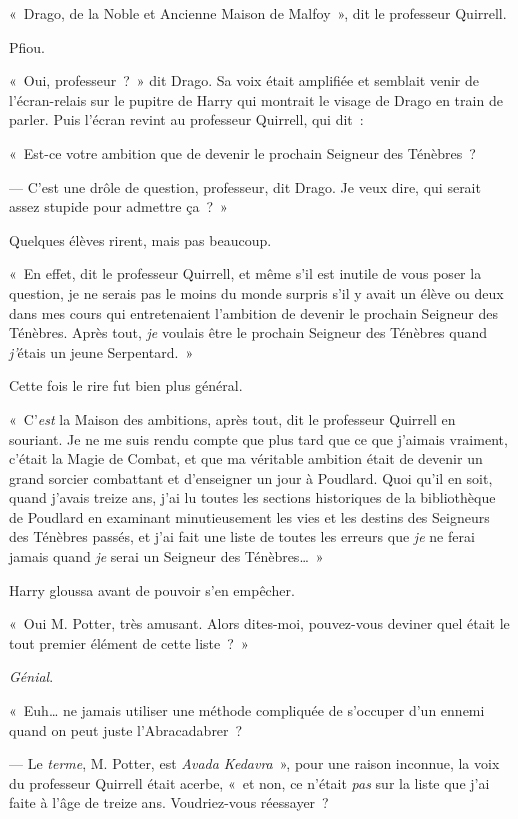 «~Drago, de la Noble et Ancienne Maison de Malfoy~», dit le professeur Quirrell.

Pfiou.

«~Oui, professeur~?~»
dit Drago.
Sa voix était amplifiée et semblait venir de l'écran-relais sur le pupitre de Harry qui montrait le visage de Drago en train de parler.
Puis l'écran revint au professeur Quirrell, qui dit~:

«~Est-ce votre ambition que de devenir le prochain Seigneur des Ténèbres~?

--- C'est une drôle de question, professeur, dit Drago.
Je veux dire, qui serait assez stupide pour admettre ça~?~»

Quelques élèves rirent, mais pas beaucoup.

«~En effet, dit le professeur Quirrell, et même s'il est inutile de vous poser la question, je ne serais pas le moins du monde surpris s'il y avait un élève ou deux dans mes cours qui entretenaient l'ambition de devenir le prochain Seigneur des Ténèbres.
Après tout, \emph{je} voulais être le prochain Seigneur des Ténèbres quand \emph{j'}étais un jeune Serpentard.~»

Cette fois le rire fut bien plus général.

«~C'\emph{est} la Maison des ambitions, après tout, dit le professeur Quirrell en souriant.
Je ne me suis rendu compte que plus tard que ce que j'aimais vraiment, c'était la Magie de Combat, et que ma véritable ambition était de devenir un grand sorcier combattant et d'enseigner un jour à Poudlard.
Quoi qu'il en soit, quand j'avais treize ans, j'ai lu toutes les sections historiques de la bibliothèque de Poudlard en examinant minutieusement les vies et les destins des Seigneurs des Ténèbres passés, et j'ai fait une liste de toutes les erreurs que \emph{je} ne ferai jamais quand \emph{je} serai un Seigneur des Ténèbres…~»

Harry gloussa avant de pouvoir s'en empêcher.

«~Oui M. Potter, très amusant.
Alors dites-moi, pouvez-vous deviner quel était le tout premier élément de cette liste~?~»

\emph{Génial}.

«~Euh… ne jamais utiliser une méthode compliquée de s'occuper d'un ennemi quand on peut juste l'Abracadabrer~?

--- Le \emph{terme}, M. Potter, est \emph{Avada Kedavra}~», pour une raison inconnue, la voix du professeur Quirrell était acerbe, «~et non, ce n'était \emph{pas} sur la liste que j'ai faite à l'âge de treize ans.
Voudriez-vous réessayer~?

